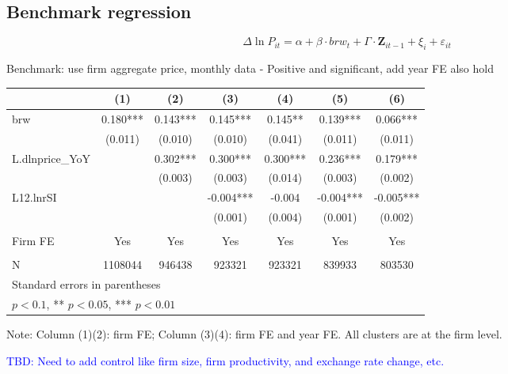 \documentclass[12pt]{article}
\begin{document}
\subsection{Benchmark regression}

\begin{equation}
    \Delta \ln P_{it} = \alpha+\beta \cdot brw_{t}+ \Gamma \cdot \textbf{Z}_{it-1}+\xi_{i}+\varepsilon_{i t}
\end{equation}


Benchmark: use firm aggregate price, monthly data
- Positive and significant, add year FE also hold

\begin{center}
\begin{tabular}{l*{6}{c}}
\toprule
          & (1)   & (2)   & (3)   & (4)   & (5)   & (6) \\
\midrule        
    brw   & 0.180*** & 0.143*** & 0.145*** & 0.145** & 0.139*** & 0.066*** \\
          & (0.011) & (0.010) & (0.010) & (0.041) & (0.011) & (0.011) \\
    L.dlnprice\_YoY &       & 0.302*** & 0.300*** & 0.300*** & 0.236*** & 0.179*** \\
          &       & (0.003) & (0.003) & (0.014) & (0.003) & (0.002) \\
    L12.lnrSI &       &       & -0.004*** & -0.004 & -0.004*** & -0.005*** \\
          &       &       & (0.001) & (0.004) & (0.001) & (0.002) \\
          &       &       &       &       &       &  \\
    Firm FE & Yes   & Yes   & Yes   & Yes   & Yes   & Yes \\
          &       &       &       &       &       &  \\
    N     & 1108044 & 946438 & 923321 & 923321 & 839933 & 803530 \\
\bottomrule
\multicolumn{5}{l}{\footnotesize Standard errors in parentheses}\\
\multicolumn{5}{l}{\footnotesize * \(p<0.1\), ** \(p<0.05\), *** \(p<0.01\)}\\
\end{tabular}
\end{center}

Note: Column (1)(2): firm FE; Column (3)(4): firm FE and year FE. All clusters are at the firm level.

\textcolor{blue}{TBD: Need to add control like firm size, firm productivity, and exchange rate change, etc.}
\end{document}
